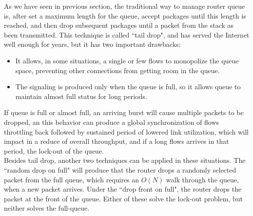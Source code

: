 As we have seen in previous section, the traditional way to manage router queue
is, after set a maximum length for the queue, accept packages until this length
is reached, and then drop subsequent packages until a packet from the stack as
been transmitted. This technique is called ``tail drop", and has served the
Internet well enough for years, but it has two important drawbacks:\\

\begin{itemize}
\item It allows, in some situations, a single or few flows to monopolize the
queue space, preventing other connections from getting room in the queue.
\item The signaling is produced only when the queue is full, so it allows queue
to maintain almost full status for long periods.
\end{itemize}

If queue is full or almost full, an arriving burst will cause multiple packets to
be dropped, an this behavior can produce a global synchronization of flows
throttling back followed by sustained period of lowered link utilization, which
will impact in a reduce of overall throughput, and if a long flows arrives in
that period, the lock-out of the queue.\\

Besides tail drop, another two techniques can be applied in these situations.
The ``random drop on full" will produce that the router drops a randomly selected
packet from the full queue, which requires an $O(N)$ walk through the queue, when a
new packet arrives. Under the ``drop front on full", the router drops the packet
at the front of the queue. Either of these solve the lock-out problem, but
neither solves the full-queue.\\
